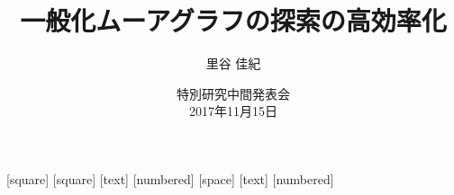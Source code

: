 \usepackage{amsmath,amsthm,amssymb}
\usepackage{graphicx}
\usepackage{subfig}
\usepackage{bxdpx-beamer}
\usepackage{pxjahyper}
\usepackage{appendixnumberbeamer}

[square]
[square]
[text]
\renewcommand{\kanjifamilydefault}{\gtdefault}
\renewcommand{\familydefault}{\sfdefault}
[numbered]
[space]
[text]
[numbered]
\renewcommand{\figurename}{図}
\renewcommand{\tablename}{表}
\renewcommand{\appendixname}{補足}
\theoremstyle{definition}
\newtheorem{thm}{定理}
\newtheorem{conj}[thm]{予想}
\graphicspath{{../res/figure/}{../res/plot-mid/}}
\makeatletter
{}
\makeatother


\title{一般化ムーアグラフの探索の高効率化}
\author{里谷 佳紀}
\date[特別研究中間発表会]{特別研究中間発表会 \\ 2017年11月15日}
